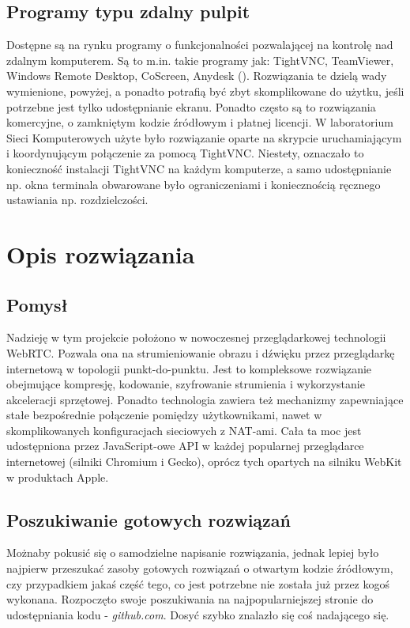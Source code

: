 \documentclass[a4paper,11pt]{article}
\begin{document}
        \subsection{Programy typu zdalny pulpit}
        Dostępne są na rynku programy o funkcjonalności pozwalającej na kontrolę nad zdalnym komputerem. 
        Są to m.in. takie programy jak: TightVNC, TeamViewer, Windows Remote Desktop, CoScreen, Anydesk (\cite{8}). 
        Rozwiązania te dzielą wady wymienione, powyżej, a ponadto potrafią być zbyt skomplikowane do użytku, jeśli potrzebne jest tylko udostępnianie ekranu. 
        Ponadto często są to rozwiązania komercyjne, o zamkniętym kodzie źródłowym i płatnej licencji. 
        W laboratorium Sieci Komputerowych użyte było rozwiązanie oparte na skrypcie uruchamiającym i koordynującym połączenie za pomocą TightVNC. 
        Niestety, oznaczało to konieczność instalacji TightVNC na każdym komputerze, a samo udostępnianie np. okna terminala obwarowane było ograniczeniami i koniecznością ręcznego ustawiania np. rozdzielczości. 
    \section{Opis rozwiązania}
        \subsection{Pomysł}
        Nadzieję w tym projekcie położono w nowoczesnej przeglądarkowej technologii WebRTC. Pozwala ona na strumieniowanie obrazu i dźwięku przez przeglądarkę internetową w topologii punkt-do-punktu. 
        Jest to kompleksowe rozwiązanie obejmujące kompresję, kodowanie, szyfrowanie strumienia i wykorzystanie akceleracji sprzętowej.
        Ponadto technologia zawiera też mechanizmy zapewniające stałe bezpośrednie połączenie pomiędzy użytkownikami, nawet w skomplikowanych konfiguracjach sieciowych z NAT-ami.
        Cała ta moc jest udostępniona przez JavaScript-owe API w każdej popularnej przeglądarce internetowej (silniki Chromium i Gecko), oprócz tych opartych na silniku WebKit w produktach Apple. 
        \subsection{Poszukiwanie gotowych rozwiązań}
        Możnaby pokusić się o samodzielne napisanie rozwiązania, jednak lepiej było najpierw przeszukać zasoby gotowych rozwiązań o otwartym kodzie źródłowym,
        czy przypadkiem jakaś część tego, co jest potrzebne nie została już przez kogoś wykonana.
        Rozpoczęto swoje poszukiwania na najpopularniejszej stronie do udostępniania kodu - \emph{github.com}. Dosyć szybko znalazło się coś nadającego się.
\end{document}
